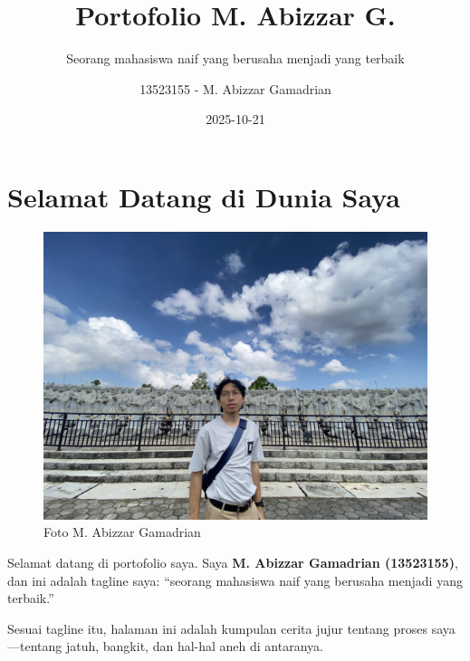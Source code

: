\documentclass[
  letterpaper,
  DIV=11,
  numbers=noendperiod]{scrreprt}
\title{Portofolio M. Abizzar G.}
\subtitle{Seorang mahasiswa naif yang berusaha menjadi yang terbaik}
\author{13523155 - M. Abizzar Gamadrian}
\date{2025-10-21}
\renewcommand*\contentsname{Table of contents}
\newcommand\contentsname{Table of contents}
\begin{document}
\maketitle

\renewcommand*\contentsname{Table of contents}
{
\hypersetup{linkcolor=}
\setcounter{tocdepth}{2}
\tableofcontents
}


\chapter*{Selamat Datang di Dunia
Saya}\label{selamat-datang-di-dunia-saya}


\begin{figure}[H]

{\centering \includegraphics[width=9.5\linewidth,height=\textheight,keepaspectratio]{images/profile.jpg}

}

\caption{Foto M. Abizzar Gamadrian}

\end{figure}%

Selamat datang di portofolio saya. Saya \textbf{M. Abizzar Gamadrian
(13523155)}, dan ini adalah tagline saya: ``seorang mahasiswa naif yang
berusaha menjadi yang terbaik.''

Sesuai tagline itu, halaman ini adalah kumpulan cerita jujur tentang
proses saya---tentang jatuh, bangkit, dan hal-hal aneh di antaranya.
\end{document}
